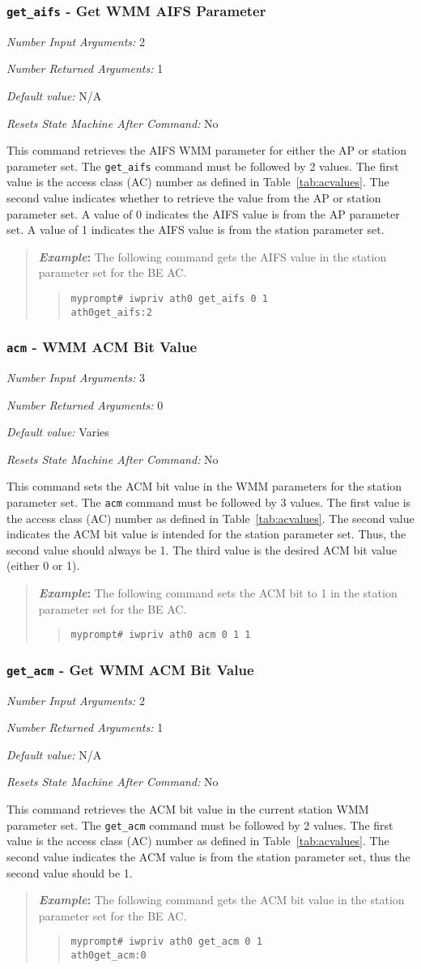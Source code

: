\documentclass[10pt,fullpage]{article}
\newcommand{\mytt}[1]{{\texttt{#1}}}
\newcommand{\bv}{\begin{verse}}
\newcommand{\ev}{\end{verse}}
\newcommand{\cmd}[1]{{\texttt{myprompt\# #1}}}
\newcommand{\argdesc}[4]{\begin{description}
\itemsep -6pt
\item \textit{Number Input Arguments:} #1
\item \textit{Number Returned Arguments:} #2
\item \textit{Default value:} #3
\item \textit{Resets State Machine After Command:} #4
\end{description}
}
\newenvironment{example}{\begin{quote}\textbf{\textit{Example}:}}{\end{quote}}
\begin{document}
\subsubsection{\mytt{get\_aifs} - Get WMM AIFS Parameter}
\argdesc{2}{1}{N/A}{No}
This command retrieves the AIFS WMM parameter for either the AP
or station parameter set. The \mytt{get\_aifs} command must be
followed by 2 values.  The first value is the access class (AC) number
as defined in Table~\ref{tab:acvalues}.  The second value indicates
whether to retrieve the value from the AP or station parameter set. A
value of 0 indicates the AIFS value is from the AP parameter set.  A
value of 1 indicates the AIFS value is from the station parameter set.
\begin{example}
  The following command gets the AIFS value in the station parameter
  set for the BE AC.
  \bv
  \cmd{iwpriv ath0 get\_aifs 0 1}\\
  \mytt{ath0\hspace{32pt}get\_aifs:2}
  \ev
\end{example}

\subsubsection{\mytt{acm} - WMM ACM Bit Value}
\argdesc{3}{0}{Varies}{No}
This command sets the ACM bit value in the WMM parameters for the
station parameter set.  The \mytt{acm} command must be followed by 3
values.  The first value is the access class (AC) number as defined in
Table~\ref{tab:acvalues}.  The second value indicates the ACM bit
value is intended for the station parameter set.  Thus, the second
value should always be 1.  The third value is the desired ACM bit
value (either 0 or 1).
\begin{example}
  The following command sets the ACM bit to 1 in the station parameter
  set for the BE AC.
  \bv
  \cmd{iwpriv ath0 acm 0 1 1}
  \ev
\end{example}

\subsubsection{\mytt{get\_acm} - Get WMM ACM Bit Value}
\argdesc{2}{1}{N/A}{No}
This command retrieves the ACM bit value in the current station WMM
parameter set.  The \mytt{get\_acm} command must be followed by 2
values.  The first value is the access class (AC) number as defined in
Table~\ref{tab:acvalues}.  The second value indicates the ACM value is
from the station parameter set, thus the second value should be 1.
\begin{example}
  The following command gets the ACM bit value in the station
  parameter set for the BE AC.
  \bv
  \cmd{iwpriv ath0 get\_acm 0 1}\\
  \mytt{ath0\hspace{32pt}get\_acm:0}
  \ev
\end{example}
\end{document}
